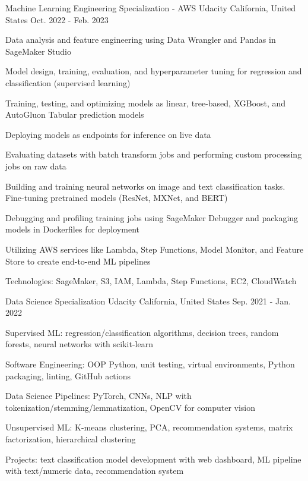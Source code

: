 \begin{cventries}
  \cventry
    {Machine Learning Engineering Specialization - AWS} %
    {Udacity} %
    {California, United States} %
    {Oct. 2022 - Feb. 2023} %
    {
      \begin{cvitems} %
        \item {Data analysis and feature engineering using Data Wrangler and Pandas in SageMaker Studio}
        \item {Model design, training, evaluation, and hyperparameter tuning for regression and classification (supervised learning)}
        \item {Training, testing, and optimizing models as linear, tree-based, XGBoost, and AutoGluon Tabular prediction models}
        \item {Deploying models as endpoints for inference on live data}
        \item {Evaluating datasets with batch transform jobs and performing custom processing jobs on raw data}
        \item {Building and training neural networks on image and text classification tasks. Fine-tuning pretrained models (ResNet, MXNet, and BERT)}
        \item {Debugging and profiling training jobs using SageMaker Debugger and packaging models in Dockerfiles for deployment}
        \item {Utilizing AWS services like Lambda, Step Functions, Model Monitor, and Feature Store to create end-to-end ML pipelines}
        \item {Technologies: SageMaker, S3, IAM, Lambda, Step Functions, EC2, CloudWatch}
      \end{cvitems}
    }

  \cventry
    {Data Science Specialization} %
    {Udacity} %
    {California, United States} %
    {Sep. 2021 - Jan. 2022} %
    {
      \begin{cvitems} %
        \item {Supervised ML: regression/classification algorithms, decision trees, random forests, neural networks with scikit-learn}
        \item {Software Engineering: OOP Python, unit testing, virtual environments, Python packaging, linting, GitHub actions}
        \item {Data Science Pipelines: PyTorch, CNNs, NLP with tokenization/stemming/lemmatization, OpenCV for computer vision}
        \item {Unsupervised ML: K-means clustering, PCA, recommendation systems, matrix factorization, hierarchical clustering}
        \item {Projects: text classification model development with web dashboard, ML pipeline with text/numeric data, recommendation system}
      \end{cvitems}
    }


\end{cventries}
